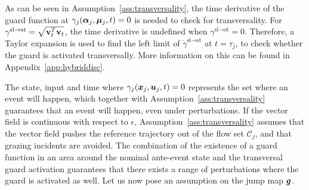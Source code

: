 \documentclass[../DC2017114Bouma.tex]{subfiles}
\begin{document}
\begin{sloppypar}
\begin{myremark}
As can be seen in Assumption~\ref{ass:transversality}, the time derivative of the guard function at $\gamma_j(\boldsymbol{\alpha}_j,\boldsymbol{\mu}_j,t) = 0$ is needed to check for transversality. For $\gamma^{\text{sl}\rightarrow\text{st}} = \sqrt{\mathbf{v}_t^T\mathbf{v}_t}$, the time derivative is undefined when $\gamma^{\text{sl}\rightarrow\text{st}} = 0$. Therefore, a Taylor expansion is used to find the left limit of $\dot{\gamma}^{\text{sl}\rightarrow\text{st}}$ at $t = \tau_j$, to check whether the guard is activated transversally. More information on this can be found in Appendix~\ref{app:hybriddisc}.
\end{myremark}
\end{sloppypar}



The state, input and time where $\gamma_j({\boldsymbol{x}}_j,{\boldsymbol{u}}_j,t) = 0$ represents the set where an event will happen, which together with Assumption~\ref{ass:transversality} guarantees that an event will happen, even under perturbations. If the vector field is continuous with respect to $\epsilon$, Assumption~\ref{ass:transversality} assumes that the vector field pushes the reference trajectory out of the flow set $\mathcal{C}_j$, and that grazing incidents are avoided. The combination of the existence of a guard function in an area around the nominal ante-event state and the transversal guard activation guarantees that there exists a range of perturbations where the guard is activated as well. Let us now pose an assumption on the jump map ${\boldsymbol{g}}$.
\end{document}
